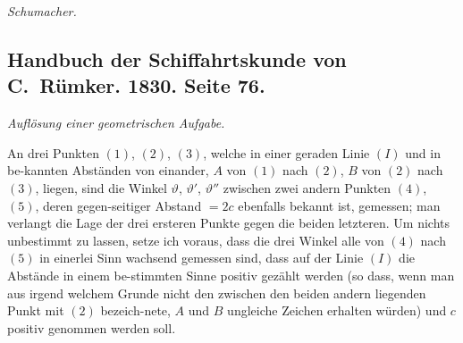 \documentclass[12pt,a4paper]{article}
\begin{document}
\textit{Schumacher.}

\newpage
\subsection*{Handbuch der Schiffahrtskunde von C.~R\"umker. 1830. Seite 76.}

\textit{Aufl\"osung einer geometrischen Aufgabe.}

An drei Punkten $(1)$, $(2)$, $(3)$, welche in einer geraden Linie $(I)$ und in be-\/kannten Abst\"anden von einander, $A$ von $(1)$ nach $(2)$, $B$ von $(2)$ nach $(3)$, liegen,
sind die Winkel $\vartheta$, $\vartheta'$, $\vartheta''$ zwischen zwei andern Punkten $(4)$, $(5)$, deren gegen-\/seitiger Abstand $= 2c$ ebenfalls bekannt ist, gemessen; man verlangt die Lage
der drei ersteren Punkte gegen die beiden letzteren. Um nichts unbestimmt zu
lassen, setze ich voraus, dass die drei Winkel alle von $(4)$ nach $(5)$ in einerlei
Sinn wachsend gemessen sind, dass auf der Linie $(I)$ die Abst\"ande in einem be-\/stimmten Sinne positiv gez\"ahlt werden (so dass, wenn man aus irgend welchem
Grunde nicht den zwischen den beiden andern liegenden Punkt mit $(2)$ bezeich-\/nete, $A$ und $B$ ungleiche Zeichen erhalten w\"urden) und $c$ positiv genommen
werden soll.
\end{document}
